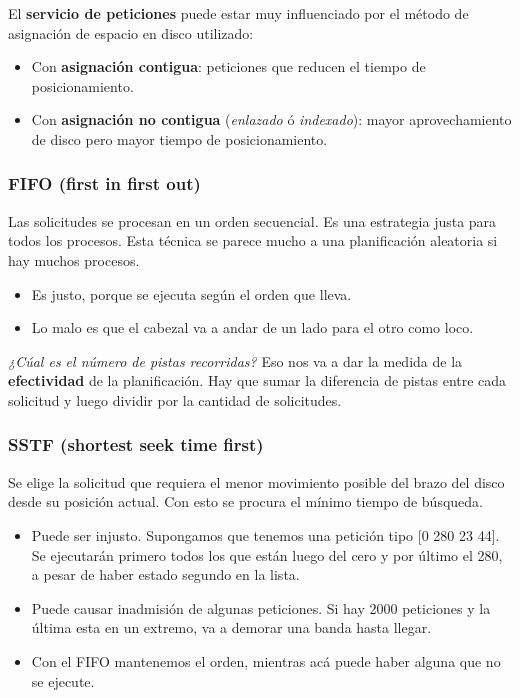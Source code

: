 \documentclass[10pt,a4paper]{article}
\begin{document}
El \textbf{servicio de peticiones} puede estar muy influenciado por el método de asignación de espacio en disco utilizado:
\begin{itemize}
\item Con \textbf{asignación contigua}: peticiones que reducen el tiempo de
posicionamiento.
\item Con \textbf{asignación no contigua} (\textit{enlazado} ó \textit{indexado}): mayor aprovechamiento de disco pero mayor tiempo de posicionamiento.
\end{itemize}

\subsubsection{FIFO (first in first out)}
Las solicitudes se procesan en un orden secuencial. Es una estrategia justa para todos los procesos. Esta técnica se parece mucho a una planificación aleatoria si hay muchos procesos.

\begin{itemize}
\item Es justo, porque se ejecuta según el orden que lleva.
\item Lo malo es que el cabezal va a andar de un lado para el otro como loco.
\end{itemize}

\textit{¿Cúal es el número de pistas recorridas?} Eso nos va a dar la medida de la \textbf{efectividad} de la planificación. Hay que sumar la diferencia de pistas entre cada solicitud y luego dividir por la cantidad de solicitudes.

\subsubsection{SSTF (shortest seek time first)}
Se elige la solicitud que requiera el menor movimiento posible del brazo del disco desde su posición actual. Con esto se procura el mínimo tiempo de búsqueda.

\begin{itemize}
\item Puede ser injusto. Supongamos que tenemos una petición tipo [0 280 23 44]. Se ejecutarán primero todos los que están luego del cero y por último el 280, a pesar de haber estado segundo en la lista.
\item Puede causar inadmisión de algunas peticiones. Si hay 2000 peticiones y la última esta en un extremo, va a demorar una banda hasta llegar.
\item Con el FIFO mantenemos el orden, mientras acá puede haber alguna que no se ejecute.
\end{itemize}
\end{document}
